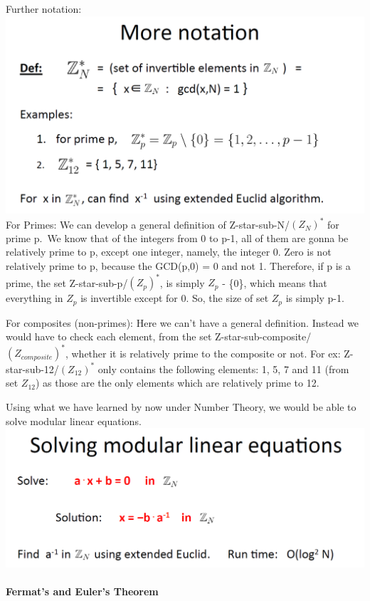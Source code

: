 \documentclass[11pt]{article}
\makeatletter
\def\maxwidth{\ifdim\Gin@nat@width>\linewidth\linewidth
    \else\Gin@nat@width\fi}
\let\Oldincludegraphics\includegraphics
\renewcommand{\includegraphics}[1]{\Oldincludegraphics[width=.8\maxwidth]{#1}}
\makeatother
\begin{document}
Further notation: \includegraphics{./Images/NT-moreNotation.png} For
Primes: We can develop a general definition of
Z-star-sub-N/\((Z_{N})^{*}\) for prime p.~We know that of the integers
from 0 to p-1, all of them are gonna be relatively prime to p, except
one integer, namely, the integer 0. Zero is not relatively prime to p,
because the GCD(p,0) = 0 and not 1. Therefore, if p is a prime, the set
Z-star-sub-p/\((Z_{p})^{*}\), is simply \(Z_{p}\) - \{0\}, which means
that everything in \(Z_{p}\) is invertible except for 0. So, the size of
set \(Z_{p}\) is simply p-1.

For composites (non-primes): Here we can't have a general definition.
Instead we would have to check each element, from the set
Z-star-sub-composite/\((Z_{composite})^{*}\), whether it is relatively
prime to the composite or not. For ex: Z-star-sub-12/\((Z_{12})^{*}\)
only contains the following elements: 1, 5, 7 and 11 (from set
\(Z_{12}\)) as those are the only elements which are relatively prime to
12.

Using what we have learned by now under Number Theory, we would be able
to solve modular linear equations.
\includegraphics{./Images/NT-ModularLinearEqn.png}

\hypertarget{fermats-and-eulers-theorem}{%
\paragraph{Fermat's and Euler's
Theorem}\label{fermats-and-eulers-theorem}}
\end{document}
